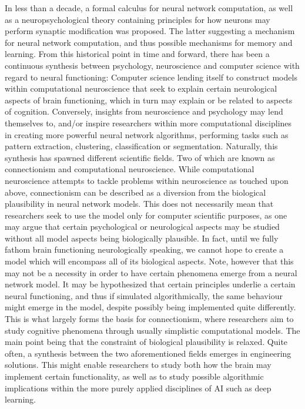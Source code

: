 In less than a decade, a formal calculus for neural network computation, as well as a neuropsychological theory containing principles for how neurons may perform synaptic modification was proposed. The latter suggesting a mechanism for neural network computation, and thus possible mechanisms for memory and learning. From this historical point in time and forward, there has been a continuous synthesis between psychology, neuroscience and computer science with regard to neural functioning: Computer science lending itself to construct models within computational neuroscience that seek to explain certain neurological aspects of brain functioning, which in turn may explain or be related to aspects of cognition. Conversely, insights from neuroscience and psychology may lend themselves to, and/or inspire researchers within more computational disciplines in creating more powerful neural network algorithms, performing tasks such as pattern extraction, clustering, classification or segmentation. 
Naturally, this synthesis has spawned different scientific fields. Two of which are known as connectionism and computational neuroscience. While computational neuroscience attempts to tackle problems within neuroscience as touched upon above, connectionism can be described as a diversion from the biological plausibility in neural network models. This does not necessarily mean that researchers seek to use the model only for computer scientific purposes, as one may argue that certain psychological or neurological aspects may be studied without all model aspects being biologically plausible. In fact, until we fully fathom brain functioning neurologically speaking, we cannot hope to create a model which will encompass all of its biological aspects. Note, however that this may not be a necessity in order to have certain phenomena emerge from a neural network model. It may be hypothesized that certain principles underlie a certain neural functioning, and thus if simulated algorithmically, the same behaviour might emerge in the model, despite possibly being implemented quite differently. This is what largely forms the basis for connectionism, where researchers aim to study cognitive phenomena through usually simplistic computational models. The main point being that the constraint of biological plausibility is relaxed.
Quite often, a synthesis between the two aforementioned fields emerges in engineering solutions. This might enable researchers to study both how the brain may implement certain functionality, as well as to study possible algorithmic implications within the more purely applied disciplines of AI such as deep learning.
\\

